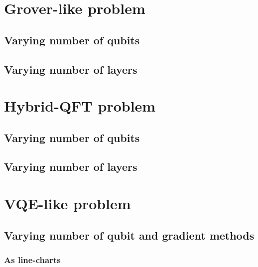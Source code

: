 \documentclass{article}
\newcommand{\SYSHASH}{628f56}
\newcommand{\TAG}{1003}
\newcommand{\bmimage}[1]{
    \begin{center}
    
    \end{center}}
\begin{document}
\pagebreak
\section{Grover-like problem}

\subsection{Varying number of qubits}

\bmimage{regular_grover_compile}

\bmimage{regular_grover_runtime}

\pagebreak
\subsection{Varying number of layers}

\bmimage{deep_grover_compile}

\bmimage{deep_grover_runtime}

\section{Hybrid-QFT problem}

\subsection{Varying number of qubits}

\bmimage{regular_qfth_compile}

\bmimage{regular_qfth_runtime}

\pagebreak
\subsection{Varying number of layers}

\bmimage{deep_qfth_compile}

\bmimage{deep_qfth_runtime}

\pagebreak
\section{VQE-like problem}

\subsection{Varying number of qubit and gradient methods}

\subsubsection{As line-charts}
\end{document}
